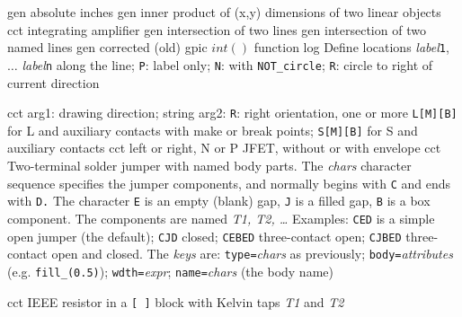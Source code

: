   {gen}%
  {absolute inches}%
%
  {gen}%
  {inner product of (x,y) dimensions of two linear objects}%
%
  {cct}%
  {integrating amplifier}%
%
  {gen}%
  {intersection of two lines}%
%
  {gen}%
  {intersection of two named lines}%
%
  {gen}%
  {corrected (old) gpic $int()$ function}%
%
  {log}%
  {Define locations {\sl label}{\tt 1}, $\ldots$ {\sl label}{\tt n}
    along the line; {\tt P}: label only;
    {\tt N}: with {\tt NOT\_circle};
    {\tt R}: circle to right of current direction }%

%

%
  {cct}%
  {arg1: drawing direction; string arg2: {\tt R}: right orientation,
   one or more {\tt L[M][B]} for L and auxiliary contacts with make or break
   points; {\tt S[M][B]} for S and auxiliary contacts
   }%
%
  {cct}%
  {left or right, N or P JFET, without or with envelope
    }%
%
  {cct}%
  { Two-terminal solder jumper with named body parts.
    The {\sl chars} character sequence specifies the jumper components,
    and normally begins with {\tt C} and ends with {\tt D.} The character
    {\tt E} is an empty (blank) gap, {\tt J} is a filled gap, {\tt B}
    is a box component.  The components are named {\sl T1, T2, \ldots}
    Examples: {\tt CED} is a simple open jumper (the default); {\tt CJD}
    closed; {\tt CEBED} three-contact open; {\tt CJBED} three-contact
    open and closed.
    The {\sl keys} are: {\tt type=}{\sl chars} as previously;
                        {\tt body=}{\sl attributes} (e.g. {\tt fill\_(0.5)});
                        {\tt wdth=}{\sl expr};
                        {\tt name=}{\sl chars} (the body name)%
}%

%

%
  {cct}%
  {IEEE resistor in a {\tt [ ]} block with Kelvin taps {\sl T1} and {\sl T2}
   }%

%

